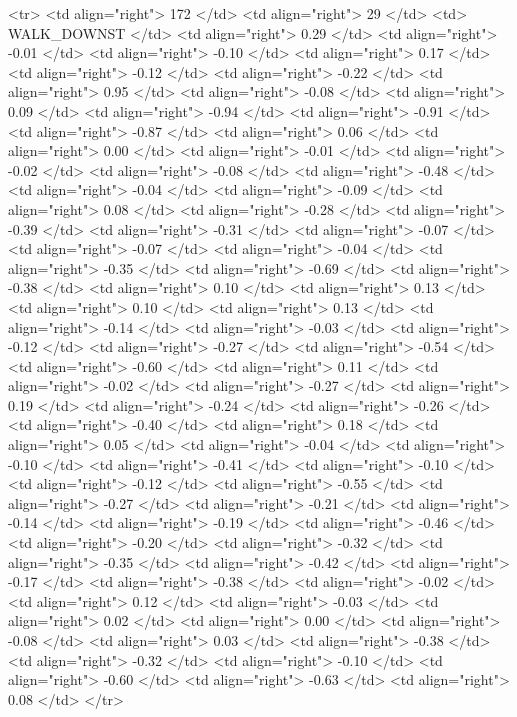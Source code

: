   <tr> <td align="right"> 172 </td> <td align="right">  29 </td> <td> WALK_DOWNST </td> <td align="right"> 0.29 </td> <td align="right"> -0.01 </td> <td align="right"> -0.10 </td> <td align="right"> 0.17 </td> <td align="right"> -0.12 </td> <td align="right"> -0.22 </td> <td align="right"> 0.95 </td> <td align="right"> -0.08 </td> <td align="right"> 0.09 </td> <td align="right"> -0.94 </td> <td align="right"> -0.91 </td> <td align="right"> -0.87 </td> <td align="right"> 0.06 </td> <td align="right"> 0.00 </td> <td align="right"> -0.01 </td> <td align="right"> -0.02 </td> <td align="right"> -0.08 </td> <td align="right"> -0.48 </td> <td align="right"> -0.04 </td> <td align="right"> -0.09 </td> <td align="right"> 0.08 </td> <td align="right"> -0.28 </td> <td align="right"> -0.39 </td> <td align="right"> -0.31 </td> <td align="right"> -0.07 </td> <td align="right"> -0.07 </td> <td align="right"> -0.04 </td> <td align="right"> -0.35 </td> <td align="right"> -0.69 </td> <td align="right"> -0.38 </td> <td align="right"> 0.10 </td> <td align="right"> 0.13 </td> <td align="right"> 0.10 </td> <td align="right"> 0.13 </td> <td align="right"> -0.14 </td> <td align="right"> -0.03 </td> <td align="right"> -0.12 </td> <td align="right"> -0.27 </td> <td align="right"> -0.54 </td> <td align="right"> -0.60 </td> <td align="right"> 0.11 </td> <td align="right"> -0.02 </td> <td align="right"> -0.27 </td> <td align="right"> 0.19 </td> <td align="right"> -0.24 </td> <td align="right"> -0.26 </td> <td align="right"> -0.40 </td> <td align="right"> 0.18 </td> <td align="right"> 0.05 </td> <td align="right"> -0.04 </td> <td align="right"> -0.10 </td> <td align="right"> -0.41 </td> <td align="right"> -0.10 </td> <td align="right"> -0.12 </td> <td align="right"> -0.55 </td> <td align="right"> -0.27 </td> <td align="right"> -0.21 </td> <td align="right"> -0.14 </td> <td align="right"> -0.19 </td> <td align="right"> -0.46 </td> <td align="right"> -0.20 </td> <td align="right"> -0.32 </td> <td align="right"> -0.35 </td> <td align="right"> -0.42 </td> <td align="right"> -0.17 </td> <td align="right"> -0.38 </td> <td align="right"> -0.02 </td> <td align="right"> 0.12 </td> <td align="right"> -0.03 </td> <td align="right"> 0.02 </td> <td align="right"> 0.00 </td> <td align="right"> -0.08 </td> <td align="right"> 0.03 </td> <td align="right"> -0.38 </td> <td align="right"> -0.32 </td> <td align="right"> -0.10 </td> <td align="right"> -0.60 </td> <td align="right"> -0.63 </td> <td align="right"> 0.08 </td> </tr>
